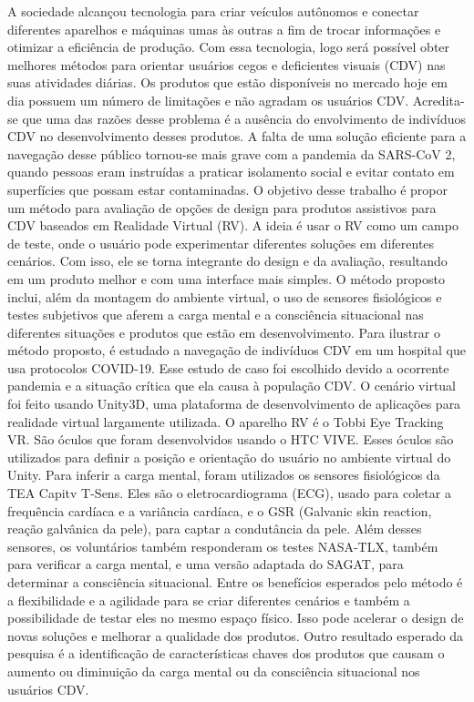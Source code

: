 
A sociedade alcançou tecnologia para criar veículos autônomos e conectar diferentes aparelhos e máquinas umas às outras a fim de trocar informações e otimizar a eficiência de produção. Com essa tecnologia, logo será possível obter melhores métodos para orientar usuários cegos e deficientes visuais (CDV) nas suas atividades diárias. Os produtos que estão disponíveis no mercado hoje em dia possuem um número de limitações e não agradam os usuários CDV. Acredita-se que uma das razões desse problema é a ausência do envolvimento de indivíduos CDV no desenvolvimento desses produtos. A falta de uma solução eficiente para a navegação desse público tornou-se mais grave com a pandemia da SARS-CoV 2, quando pessoas eram instruídas a praticar isolamento social e evitar contato em superfícies que possam estar contaminadas. O objetivo desse trabalho é propor um método para avaliação de opções de design para produtos assistivos para CDV baseados em Realidade Virtual (RV). A ideia é usar o RV como um campo de teste, onde o usuário pode experimentar diferentes soluções em diferentes cenários. Com isso, ele se torna integrante do design e da avaliação, resultando em um produto melhor e com uma interface mais simples. O método proposto inclui, além da montagem do ambiente virtual, o uso de sensores fisiológicos e testes subjetivos que aferem a carga mental e a consciência situacional nas diferentes situações e produtos que estão em desenvolvimento. Para ilustrar o método proposto, é estudado a navegação de indivíduos CDV em um hospital que usa protocolos COVID-19. Esse estudo de caso foi escolhido devido a ocorrente pandemia e a situação crítica que ela causa à população CDV. O cenário virtual foi feito usando Unity3D, uma plataforma de desenvolvimento de aplicações para realidade virtual largamente utilizada. O aparelho RV é o Tobbi Eye Tracking VR. São óculos que foram desenvolvidos usando o HTC VIVE. Esses óculos são utilizados para definir a posição e orientação do usuário no ambiente virtual do Unity. Para inferir a carga mental, foram utilizados os sensores fisiológicos da TEA Capitv T-Sens. Eles são o eletrocardiograma (ECG), usado para coletar a frequência cardíaca e a variância cardíaca, e o GSR (Galvanic skin reaction, reação galvânica da pele), para captar a condutância da pele. Além desses sensores, os voluntários também responderam os testes NASA-TLX, também para verificar a carga mental, e uma versão adaptada do SAGAT, para determinar a consciência situacional. Entre os benefícios esperados pelo método é a flexibilidade e a agilidade para se criar diferentes cenários e também a possibilidade de testar eles no mesmo espaço físico. Isso pode acelerar o design de novas soluções e melhorar a qualidade dos produtos. Outro resultado esperado da pesquisa é a identificação de características chaves dos produtos que causam o aumento ou diminuição da carga mental ou da consciência situacional nos usuários CDV.
